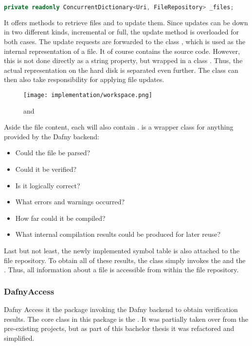 \begin{lstlisting}[language=csharp, caption={Workspace Property}, captionpos=b, label={lst:workspaceproperty}]
private readonly ConcurrentDictionary<Uri, FileRepository> _files;
\end{lstlisting}

It offers methods to retrieve files and to update them.
Since updates can be down in two different kinds, incremental or full, the update method is overloaded for both cases.
The update requests are forwarded to the class , which is used as the internal representation of a file.
It of course contains the source code.
However, this is not done directly as a string property, but wrapped in a class .
Thus, the actual representation on the hard disk is separated even further.
The  class can then also take responsibility for applying file updates.\\

\begin{figure}[H]
    \centering
    \texttt{[image: implementation/workspace.png]}
    \caption{ and }
    \label{fig:worksapceAndRepo}
\end{figure}

Aside the file content, each  will also contain .
 is a wrapper class for anything provided by the Dafny backend:
\begin{itemize}
    \item Could the file be parsed?
    \item Could it be verified?
    \item Is it logically correct?
    \item What errors and warnings occurred?
    \item How far could it be compiled?
    \item What internal compilation results could be produced for later reuse?
\end{itemize}

Last but not least, the newly implemented symbol table is also attached to the file repository.
To obtain all of these results, the class simply invokes the  and the .
Thus, all information about a file is accessible from within the file repository.

\subsubsection{DafnyAccess}
Dafny Access it the package invoking the Dafny backend to obtain verification results.
The core class in this package is the .
It was partially taken over from the pre-existing projects, but as part of this bachelor thesis it was refactored and simplified.\\

